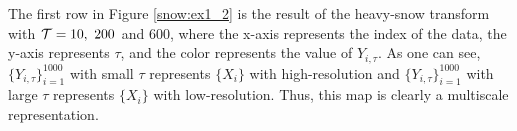 \documentclass[preprint, review, 12pt]{article}
\theoremstyle{definition}
\theoremstyle{remark}
\begin{document}

The first row in Figure \ref{snow:ex1_2} is the result of the heavy-snow transform with ${\cal T}=10,~200$ and $600$, where the x-axis represents the index of the data, the y-axis represents $\tau$, and the color represents the value of $Y_{i,\tau}$. As one can see, $\{Y_{i,\tau}\}_{i=1}^{1000}$ with small $\tau$ represents $\{X_i\}$ with high-resolution and $\{Y_{i,\tau}\}_{i=1}^{1000}$ with large $\tau$ represents $\{X_i\}$ with low-resolution. Thus, this map is clearly a multiscale representation. 
\end{document}
